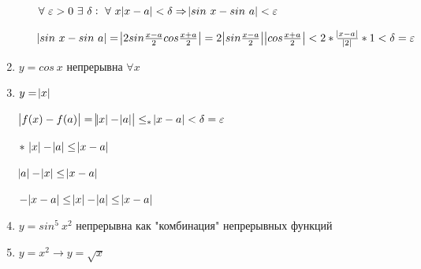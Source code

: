 \documentclass{article}
\begin{document}
\begin{enumerate}
\begin{enumerate}
            \( \forall\ \varepsilon > 0\ \exists\ \delta:\ \forall\ x \abs{x - a} < \delta \Rightarrow \abs{sin\ x - sin\ a} < \varepsilon \)
            
            \(\abs{sin\ x - sin\ a} = \abs{2sin\frac{x-a}{2}cos\frac{x+a}{2}} = 2\abs{sin\frac{x - a}{2}}\abs{cos\frac{x + a}{2}} < 2 * \frac{\abs{x - a}}{\abs{2}} * 1 < \delta = \varepsilon\)
        \end{enumerate}

        \item \(y = cos\ x\) непрерывна \(\forall x\)        
        \item \(y = \abs{x}\)

        \(\abs{f(x)-f(a)} = \abs{\abs{x}-\abs{a}} \leq_* \abs{x-a} < \delta = \varepsilon\)

        \(*\ \abs{x}-\abs{a} \leq \abs{x-a}\)
        
        \(\abs{a}-\abs{x} \leq \abs{x-a}\)

        \(-\abs{x-a} \leq \abs{x} - \abs{a} \leq \abs{x-a}\)

        \item \( y = sin^5\ x^2 \) непрерывна как "комбинация" непрерывных функций
        \item \( y = x^2 \rightarrow y = \sqrt{x} \)
    \end{enumerate}
\end{document}
